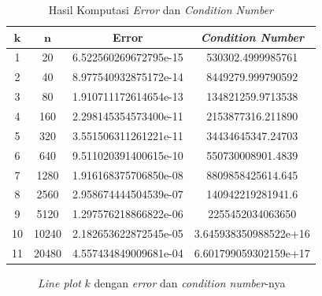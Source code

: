 \documentclass[10pt, a4paper, onecolumn, oneside, final]{report}
\begin{document}
\begin{table}[ht]
\caption{Hasil Komputasi \textit{Error} dan \textit{Condition Number}}
\begin{center}
\begin{tabular}{ |c|c|c|c| } 
\hline
$\bm{k}$ & $\bm{n}$ & \textbf{Error} & \textbf{\textit{Condition Number}} \\
\hline
1 & 20 & 6.522560269672795e-15 & 530302.4999985761 \\ 
2 & 40 & 8.977540932875172e-14 & 8449279.999790592 \\ 
3 & 80 & 1.910711172614654e-13 & 134821259.9713538 \\ 
4 & 160 & 2.298145354573400e-11 & 2153877316.211890 \\ 
5 & 320 & 3.551506311261221e-11 & 34434645347.24703 \\ 
6 & 640 & 9.511020391400615e-10 & 550730008901.4839 \\ 
7 & 1280 & 1.916168375706850e-08 & 8809858425614.645 \\ 
8 & 2560 & 2.958674444504539e-07 & 140942219281941.6 \\ 
9 & 5120 & 1.297576218866822e-06 & 2255452034063650 \\ 
10 & 10240 & 2.182653622872545e-05 & 3.645938350988522e+16 \\ 
11 & 20480 & 4.557434849009681e-04 & 6.601799059302159e+17 \\ 
\hline
\end{tabular}
\end{center}
\end{table}

\begin{figure}[h]
    \centering
    \qquad
    \caption{\textit{Line plot} $k$ dengan \textit{error} dan \textit{condition number}-nya}
\end{figure}
\end{document}

